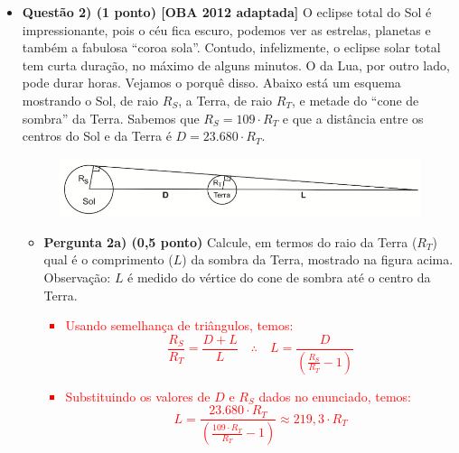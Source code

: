 \documentclass[a4paper, 12pt]{article}
\newcommand{\red}[1]{\textcolor{red}{#1}}
\begin{document}
\begin{flushleft}
\begin{itemize}
            \item \textbf{Questão 2) (1 ponto) [OBA 2012 adaptada]} O eclipse total do Sol é impressionante, pois o céu fica escuro, podemos ver as estrelas, planetas e também a fabulosa ``coroa sola''. Contudo, infelizmente, o eclipse solar total tem curta duração, no máximo de alguns minutos. O da Lua, por outro lado, pode durar horas. Vejamos o porquê disso. \linebreak \linebreak Abaixo está um esquema mostrando o Sol, de raio $R_S$, a Terra, de raio $R_T$, e metade do ``cone de sombra'' da Terra. Sabemos que $R_S = 109 \cdot R_T$ e que a distância entre os centros do Sol e da Terra é $D = 23.680 \cdot R_T$.
                \begin{figure}[H]
                    \centering
                    \includegraphics[scale=0.5]{img/2a.png}
                \end{figure}
                \begin{itemize}
                    \item \textbf{Pergunta 2a) (0,5 ponto)} Calcule, em termos do raio da Terra ($R_T$) qual é o comprimento ($L$) da sombra  da  Terra,  mostrado  na  figura acima. Observação: $L$  é  medido  do  vértice  do  cone  de sombra até o centro da Terra.
                        \red{\begin{itemize}
                            \item Usando semelhança de triângulos, temos:
                                \begin{equation*}
                                    \frac{R_S}{R_T} = \frac{D+L}{L} \quad \therefore \quad L = \frac{D}{\left(\frac{R_S}{R_T}-1\right)}
                                \end{equation*}
                            \item Substituindo os valores de $D$ e $R_S$ dados no enunciado, temos:
                                \begin{equation*}
                                    L = \frac{23.680 \cdot R_T}{\left(\frac{109 \cdot R_T}{R_T}-1\right)} \approx 219,3 \cdot R_T
                                \end{equation*}
                        \end{itemize}}

\end{itemize}
\end{itemize}
\end{flushleft}
\end{document}
